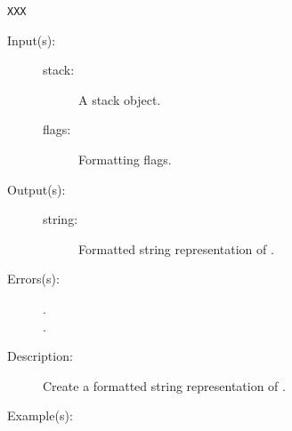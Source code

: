 \begin{description}
\begin{description}
\begin{verbatim}
XXX
		\end{verbatim}
	\end{description}
\label{outputsdict:stacktype}
\item[{\onyxop{stack flags}{stacktype}{string}}: ]
	\begin{description}\item[]
	\item[Input(s): ]
		\begin{description}\item[]
		\item[stack: ]
			A stack object.
		\item[flags: ]
			Formatting flags.
		\end{description}
	\item[Output(s): ]
		\begin{description}\item[]
		\item[string: ]
			Formatted string representation of .
		\end{description}
	\item[Errors(s): ]
		\begin{description}\item[]
		\item[.]
		\item[.]
		\end{description}
	\item[Description: ]
		Create a formatted string representation of .
	\item[Example(s): ]\begin{verbatim}


\end{verbatim}
\end{description}
\end{description}
